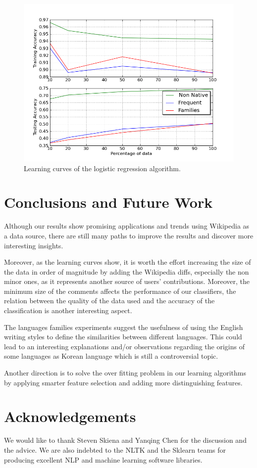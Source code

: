 \documentclass[10pt,a5paper,twoside]{article}
\begin{document}
\begin{figure}[t]
\centering
\includegraphics[scale=0.45]{combined_lc.png}
\caption{Learning curves of the logistic regression algorithm.}
\label{comb_lc}
\end{figure}


\section*{Conclusions and Future Work}
\label{conc}
Although our results show promising applications and trends using Wikipedia as a data
source, there are still many paths to improve the results and discover more interesting insights.

Moreover, as the learning curves show, it is worth the effort increasing the size
of the data in order of magnitude by adding the Wikipedia diffs, especially the
non minor ones, as it represents another source of users' contributions. Moreover, the minimum size of the comments affects the performance of our classifiers, the relation between the quality of the data used and the accuracy of the classification is another interesting aspect.

The languages families experiments suggest the usefulness of using the English
writing styles to define the similarities between different languages. This
could lead to an interesting explanations and/or observations regarding the
origins of some languages as Korean language which is still a controversial topic.

Another direction is to solve the over fitting problem in our learning algorithms by applying smarter feature selection and adding more distinguishing features.

\section*{Acknowledgements}
We would like to thank Steven Skiena and Yanqing Chen for the discussion and the advice.
We are also indebted to the NLTK and the Sklearn teams for producing excellent
NLP and machine learning software libraries.

{}

\end{document}
